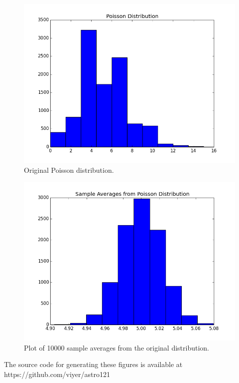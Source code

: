 \documentclass[11pt]{article}
\begin{document}
    \begin{figure}[h!]
    \centering
    \includegraphics[scale=0.4]{poisson.png}
    \caption{Original Poisson distribution.}
    \label{fig:poisson}
    \end{figure}
    
    \begin{figure}[h!]
    \centering
    \includegraphics[scale=0.4]{normal.png}
    \caption{Plot of 10000 sample averages from the original distribution.}
    \label{fig:normal}
    \end{figure}
    
  The source code for generating these figures is available at https://github.com/viyer/astro121  
\end{document}
